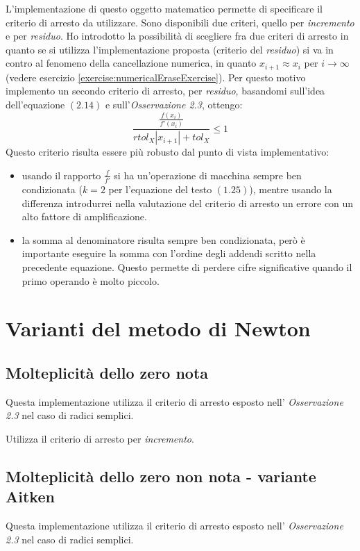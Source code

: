 L'implementazione di questo oggetto matematico permette di specificare il
criterio di arresto da utilizzare. Sono disponibili due criteri, quello per
\emph{incremento} e per \emph{residuo}. Ho introdotto la possibilit\`a di
scegliere fra due criteri di arresto in quanto se si utilizza l'implementazione
proposta (criterio del \emph{residuo}) si va in contro al fenomeno della
cancellazione numerica, in quanto $x_{i+1} \approx x_{i}$ per $i \rightarrow
\infty$ (vedere esercizio \ref{exercise:numericalEraseExercise}). Per questo
motivo implemento un secondo criterio di arresto, per \emph{residuo}, basandomi
sull'idea dell'equazione $(2.14)$ e sull'\emph{Osservazione 2.3}, ottengo:
\begin{displaymath}
\frac{\frac{f(x_{i})}{f'(x_{i})}}{rtol_{X}|x_{i + 1}| + tol_{X}} \leq 1
\end{displaymath}
Questo criterio risulta essere pi\`u robusto dal punto di vista implementativo:
\begin{itemize}
  \item usando il rapporto $\frac{f}{f'}$ si ha un'operazione di macchina sempre
  ben condizionata ($k = 2$ per l'equazione del testo $(1.25)$), mentre usando
  la differenza introdurrei nella valutazione del criterio di arresto un errore
  con un alto fattore di amplificazione.
  \item la somma al denominatore risulta sempre ben condizionata, per\`o \`e
  importante eseguire la somma con l'ordine degli addendi scritto nella
  precedente equazione. Questo permette di perdere cifre significative quando il
  primo operando \`e molto piccolo.
\end{itemize}


\section{Varianti del metodo di Newton}

\subsection{Molteplicit\`a dello zero nota}
\label{subsec:newtonMethodMultKnown}
Questa implementazione utilizza il criterio di arresto esposto nell'
\emph{Osservazione 2.3} nel caso di radici semplici. 

Utilizza il criterio di arresto per \emph{incremento}.


\subsection{Molteplicit\`a dello zero non nota - variante Aitken}
\label{subsec:newtonMethodAitken}
Questa implementazione utilizza il criterio di arresto esposto nell'
\emph{Osservazione 2.3} nel caso di radici semplici.

